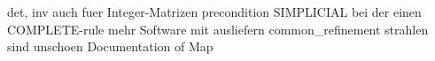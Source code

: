 det, inv auch fuer Integer-Matrizen
precondition SIMPLICIAL bei der einen COMPLETE-rule
mehr Software mit ausliefern
common_refinement strahlen sind unschoen
Documentation of Map
